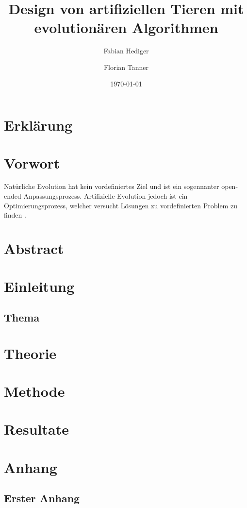 %
%





  \title{Design von artifiziellen Tieren mit evolutionären Algorithmen}
  \author{Fabian Hediger \and Florian Tanner}
  \date{\today}

  \frontmatter

  
  

  \chapter{Erklärung}
  \lipsum[1]

  \chapter{Vorwort}

    Natürliche Evolution hat kein vordefiniertes Ziel und ist ein sogennanter \grqq{} open-ended \grqq{} Anpassungsprozess. Artifizielle Evolution jedoch ist ein Optimierungsprozess, welcher versucht Lösungen zu vordefinierten Problem zu finden \cite{book:bioInspired}.


  \chapter{Abstract}
  \lipsum[3]

  \mainmatter

  \chapter{Einleitung}
  \lipsum[4-5]
  \section{Thema}
  \lipsum[5-6]

  \chapter{Theorie}
  \lipsum[6] \cite{IEEEexample:article_typical}
  \lipsum[7] \cite{mirrorcle_userguide}

  \chapter{Methode}
  \lipsum[8] \cite{microchip_spi} \cite{verryUseFulArticle}

  \chapter{Resultate}
  \lipsum[9]

  \appendix
  \chapter{Anhang}
  \section{Erster Anhang}

  \backmatter
  
  


